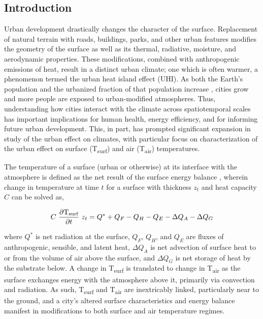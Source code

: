 \begin{bibunit}
	
\rhead{\thepage}

\chapter{Introduction}
\label{intro}

Urban development drastically changes the character of the surface. Replacement of natural terrain with roads, buildings, parks, and other urban features modifies the geometry of the surface as well as its thermal, radiative, moisture, and aerodynamic properties. These modifications, combined with anthropogenic emissions of heat, result in a distinct urban climate; one which is often warmer, a phenomenon termed the urban heat island effect (UHI). As both the Earth's population and the urbanized fraction of that population increase \citep{Nations2014}, cities grow and more people are exposed to urban-modified atmospheres. Thus, understanding how cities interact with the climate across spatiotemporal scales has important implications for human health, energy efficiency, and for informing future urban development. This, in part, has prompted significant expansion in study of the urban effect on climates, with particular focus on characterization of the urban effect on surface (T\textsubscript{surf}) and air (T\textsubscript{air}) temperatures.

\pagebreak

The temperature of a surface (urban or otherwise) at its interface with the atmosphere is defined as the net result of the surface energy balance \citep{Oke2017}, wherein change in temperature at time $t$ for a surface with thickness $z_t$ and heat capacity $C$ can be solved as,

\begin{equation}
	C~\frac{\partial \text{T\textsubscript{surf}}}{\partial t}~z_t = Q^*+ Q_F - Q_H - Q_E - \Delta Q_A - \Delta Q_G
\end{equation}

\noindent where $Q^*$ is net radiation at the surface, $Q_F$, $Q_H$, and $Q_E$ are fluxes of anthropogenic, sensible, and latent heat, $\Delta Q_A$ is net advection of surface heat to or from the volume of air above the surface, and $\Delta Q_G$ is net storage of heat by the substrate below. A change in T\textsubscript{surf} is translated to change in T\textsubscript{air} as the surface exchanges energy with the atmosphere above it, primarily via convection and radiation. As such, T\textsubscript{surf} and T\textsubscript{air} are inextricably linked, particularly near to the ground, and a city's altered surface characteristics and energy balance manifest in modifications to both surface and air temperature regimes.


\end{bibunit}
